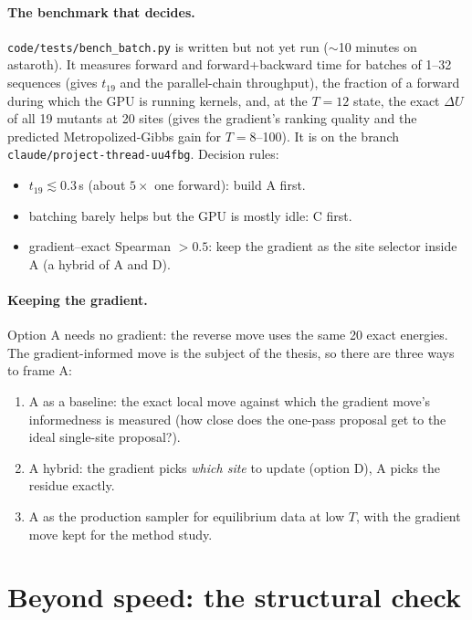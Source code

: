 \documentclass[11pt,a4paper]{article}
\newcommand{\file}[1]{\texttt{#1}}
\begin{document}
\paragraph{The benchmark that decides.} \file{code/tests/bench\_batch.py}
is written but not yet run ($\sim$10 minutes on astaroth). It measures forward and
forward+backward time for batches of 1--32 sequences (gives $t_{19}$ and the
parallel-chain throughput), the fraction of a forward during which the GPU is
running kernels, and, at the $T=12$ state, the exact $\Delta U$ of all 19
mutants at 20 sites (gives the gradient's ranking quality and the predicted
Metropolized-Gibbs gain for $T=8$--100). It is on the branch \file{claude/project-thread-uu4fbg}. Decision rules:
\begin{itemize}
\item $t_{19}\lesssim0.3$\,s (about $5\times$ one forward): build A first.
\item batching barely helps but the GPU is mostly idle: C first.
\item gradient--exact Spearman $>0.5$: keep the gradient as the site selector
  inside A (a hybrid of A and D).
\end{itemize}

\paragraph{Keeping the gradient.} Option A needs no gradient: the reverse move
uses the same 20 exact energies. The gradient-informed move is the subject of
the thesis, so there are three ways to frame A:
\begin{enumerate}
\item A as a baseline: the exact local move against which the gradient move's
  informedness is measured (how close does the one-pass proposal get to the
  ideal single-site proposal?).
\item A hybrid: the gradient picks \emph{which site} to update (option D),
  A picks the residue exactly.
\item A as the production sampler for equilibrium data at low $T$, with the
  gradient move kept for the method study.
\end{enumerate}

\section{Beyond speed: the structural check}
\end{document}
